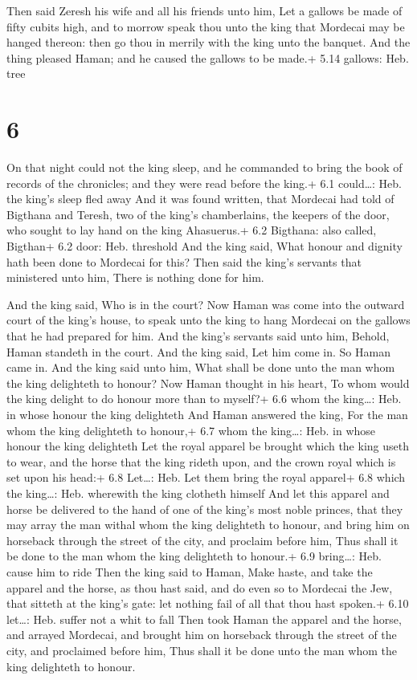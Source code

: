 Then said Zeresh his wife and all his friends unto him,
Let a gallows be made of fifty cubits high, and to morrow speak thou
unto the king that Mordecai may be hanged thereon: then go thou in
merrily with the king unto the banquet. And the thing pleased Haman; and
he caused the gallows to be made.+ 5.14 gallows: Heb. tree

\hypertarget{section-5}{%
\section{6}\label{section-5}}

 On that night could not the king sleep, and he commanded to
bring the book of records of the chronicles; and they were read before
the king.+ 6.1 could\ldots: Heb. the king's sleep fled away 
And it was found written, that Mordecai had told of Bigthana and Teresh,
two of the king's chamberlains, the keepers of the door, who sought to
lay hand on the king Ahasuerus.+ 6.2 Bigthana: also called, Bigthan+ 6.2
door: Heb. threshold  And the king said, What honour and
dignity hath been done to Mordecai for this? Then said the king's
servants that ministered unto him, There is nothing done for him.

 And the king said, Who is in the court? Now Haman was
come into the outward court of the king's house, to speak unto the king
to hang Mordecai on the gallows that he had prepared for him.
 And the king's servants said unto him, Behold, Haman
standeth in the court. And the king said, Let him come in. 
So Haman came in. And the king said unto him, What shall be done unto
the man whom the king delighteth to honour? Now Haman thought in his
heart, To whom would the king delight to do honour more than to myself?+
6.6 whom the king\ldots: Heb. in whose honour the king delighteth
 And Haman answered the king, For the man whom the king
delighteth to honour,+ 6.7 whom the king\ldots: Heb. in whose honour the
king delighteth  Let the royal apparel be brought which the
king useth to wear, and the horse that the king rideth upon, and the
crown royal which is set upon his head:+ 6.8 Let\ldots: Heb. Let them
bring the royal apparel+ 6.8 which the king\ldots: Heb. wherewith the
king clotheth himself  And let this apparel and horse be
delivered to the hand of one of the king's most noble princes, that they
may array the man withal whom the king delighteth to honour, and bring
him on horseback through the street of the city, and proclaim before
him, Thus shall it be done to the man whom the king delighteth to
honour.+ 6.9 bring\ldots: Heb. cause him to ride  Then the
king said to Haman, Make haste, and take the apparel and the horse, as
thou hast said, and do even so to Mordecai the Jew, that sitteth at the
king's gate: let nothing fail of all that thou hast spoken.+ 6.10
let\ldots: Heb. suffer not a whit to fall  Then took Haman
the apparel and the horse, and arrayed Mordecai, and brought him on
horseback through the street of the city, and proclaimed before him,
Thus shall it be done unto the man whom the king delighteth to honour.

